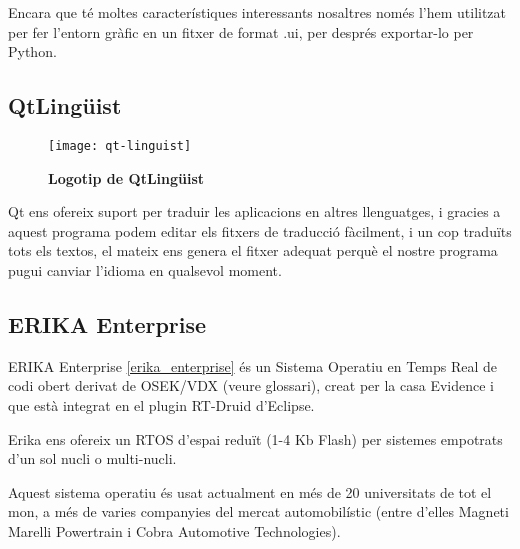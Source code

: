 Encara que té moltes característiques interessants nosaltres només l'hem utilitzat per fer l'entorn gràfic en un fitxer de format .ui, per després exportar-lo per Python.

\subsection{QtLingüist}\label{cap:tec:soft:qtlinguist}


\begin{wrapfigure}{r}{0.3\textwidth}
	\centering
	\texttt{[image: qt-linguist]}
	\caption[Logotip de QtLingüist]{{\small\textbf{Logotip de QtLingüist}}}
	\label{qt-linguist}
\end{wrapfigure}

Qt ens ofereix suport per traduir les aplicacions en altres llenguatges, i gracies a aquest programa podem editar els fitxers de traducció fàcilment, i un cop traduïts tots els textos, el mateix \Qtlinguist ens genera el fitxer adequat perquè el nostre programa \DCSMonitor pugui canviar l'idioma en qualsevol moment.

\subsection{ERIKA Enterprise}\label{cap:tec:soft:erika}


ERIKA Enterprise \ref{erika_enterprise} és un Sistema Operatiu en Temps Real de codi obert derivat de OSEK/VDX (veure glossari), creat per la casa Evidence i que està integrat en el plugin RT-Druid d'Eclipse.

Erika ens ofereix un RTOS d'espai reduït (1-4 Kb Flash) per sistemes empotrats d'un sol nucli o multi-nucli.

Aquest sistema operatiu és usat actualment en més de 20 universitats de tot el mon, a més de varies companyies del mercat automobilístic (entre d'elles Magneti Marelli Powertrain i Cobra Automotive Technologies).


